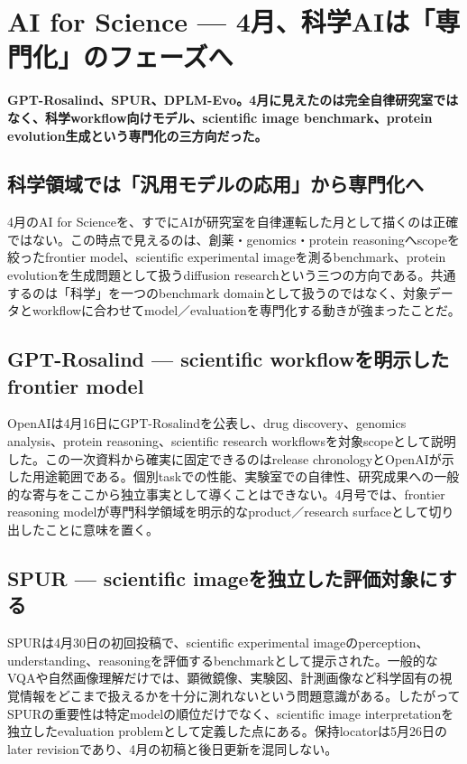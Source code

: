\section{AI for Science — 4月、科学AIは「専門化」のフェーズへ}
\noindent\textbf{GPT-Rosalind、SPUR、DPLM-Evo。4月に見えたのは完全自律研究室ではなく、科学workflow向けモデル、scientific image benchmark、protein evolution生成という専門化の三方向だった。}\autocite{src-078f0d540d88,src-7ae707d75c4b,src-f0bb84fcd319}

\subsection{科学領域では「汎用モデルの応用」から専門化へ}

4月のAI for Scienceを、すでにAIが研究室を自律運転した月として描くのは正確ではない。この時点で見えるのは、創薬・genomics・protein reasoningへscopeを絞ったfrontier model、scientific experimental imageを測るbenchmark、protein evolutionを生成問題として扱うdiffusion researchという三つの方向である。共通するのは「科学」を一つのbenchmark domainとして扱うのではなく、対象データとworkflowに合わせてmodel／evaluationを専門化する動きが強まったことだ。\autocite{src-078f0d540d88,src-7ae707d75c4b,src-f0bb84fcd319}


\subsection{GPT-Rosalind — scientific workflowを明示したfrontier model}

OpenAIは4月16日にGPT-Rosalindを公表し、drug discovery、genomics analysis、protein reasoning、scientific research workflowsを対象scopeとして説明した。この一次資料から確実に固定できるのはrelease chronologyとOpenAIが示した用途範囲である。個別taskでの性能、実験室での自律性、研究成果への一般的な寄与をここから独立事実として導くことはできない。4月号では、frontier reasoning modelが専門科学領域を明示的なproduct／research surfaceとして切り出したことに意味を置く。\autocite{src-078f0d540d88}


\subsection{SPUR — scientific imageを独立した評価対象にする}

SPURは4月30日の初回投稿で、scientific experimental imageのperception、understanding、reasoningを評価するbenchmarkとして提示された。一般的なVQAや自然画像理解だけでは、顕微鏡像、実験図、計測画像など科学固有の視覚情報をどこまで扱えるかを十分に測れないという問題意識がある。したがってSPURの重要性は特定modelの順位だけでなく、scientific image interpretationを独立したevaluation problemとして定義した点にある。保持locatorは5月26日のlater revisionであり、4月の初稿と後日更新を混同しない。\autocite{src-7ae707d75c4b}


